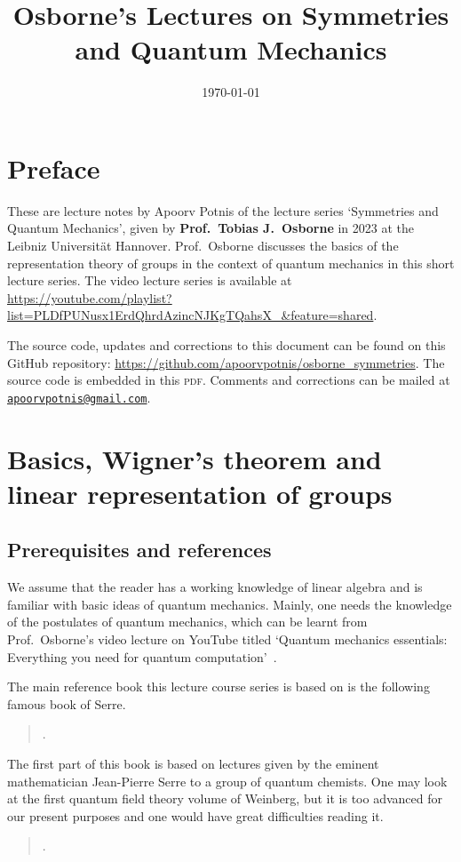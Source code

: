 \documentclass[a4 paper, 12pt]{book}
\title{\textsf{\textbf{Osborne's Lectures on Symmetries and Quantum Mechanics}}}
\author{}
\date{\textsf{\today}}
\theoremstyle{definition}
\begin{document}
	\hypertarget{TitlePage}{}
	\maketitle

	\chapter*{Preface}
	\hypertarget{Preface}{}
	These are lecture notes by Apoorv Potnis of the lecture series `Symmetries and Quantum Mechanics', given by \textbf{Prof.\ Tobias J.\ Osborne} in 2023 at the Leibniz Universität Hannover. Prof.\ Osborne discusses the basics of the representation theory of groups in the context of quantum mechanics in this short lecture series. The video lecture series is available at \url{https://youtube.com/playlist?list=PLDfPUNusx1ErdQhrdAzincNJKgTQahsX_&feature=shared}.

	The source code, updates and corrections to this document can be found on this GitHub repository: \url{https://github.com/apoorvpotnis/osborne_symmetries}. The source code is embedded in this \textsc{pdf}. Comments and corrections can be mailed at \href{mailto:apoorvpotnis@gmail.com}{\texttt{apoorvpotnis@gmail.com}}.
	\clearpage

	\hypertarget{Contents}{}
	\tableofcontents

	\chapter{Basics, Wigner's theorem and linear representation of groups}
	\chaptermark{}

	\section{Prerequisites and references}

	We assume that the reader has a working knowledge of linear algebra and is familiar with basic ideas of quantum mechanics. Mainly, one needs the knowledge of the postulates of quantum mechanics, which can be learnt from Prof.\ Osborne's video lecture on YouTube titled `Quantum mechanics essentials: Everything you need for quantum computation'~\cite{Osborne_quantum_essentials}.

	The main reference book this lecture course series is based on is the following famous book of Serre.\begin{quote}.\end{quote}The first part of this book is based on lectures given by the eminent mathematician Jean-Pierre Serre to a group of quantum chemists. One may look at the first quantum field theory volume of Weinberg, but it is too advanced for our present purposes and one would have great difficulties reading it.\begin{quote}.\end{quote}
\end{document}
